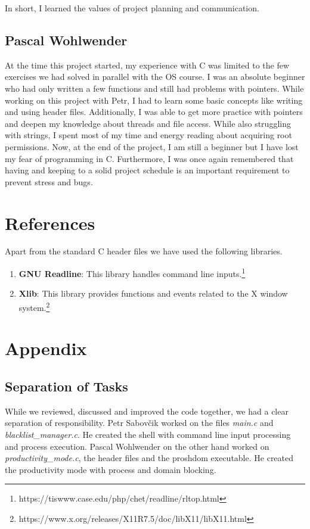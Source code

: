 \documentclass{article}
\begin{document}
In short, I learned the values of project planning and communication.


\subsection{Pascal Wohlwender}

At the time this project started, my experience with C was limited to the few exercises we had solved in parallel with the OS course. I was an absolute beginner who had only written a few functions and still had problems with pointers. While working on this project with Petr, I had to learn some basic concepts like writing and using header files. Additionally, I was able to get more practice with pointers and deepen my knowledge about threads and file access. While also struggling with strings, I spent most of my time and energy reading about acquiring root permissions. Now, at the end of the project, I am still a beginner but I have lost my fear of programming in C. Furthermore, I was once again remembered that having and keeping to a solid project schedule is an important requirement to prevent stress and bugs.

\section{References}

Apart from the standard C header files we have used the following libraries.

\begin{enumerate}
	\item \textbf{GNU Readline}: This library handles command line inputs.\footnote{https://tiswww.case.edu/php/chet/readline/rltop.html}
	\item \textbf{Xlib}: This library provides functions and events related to the X window system.\footnote{https://www.x.org/releases/X11R7.5/doc/libX11/libX11.html}
\end{enumerate}

\pagebreak

\section{Appendix}

\subsection{Separation of Tasks}

While we reviewed, discussed and improved the code together, we had a clear separation of responsibility. Petr Sabovčik worked on the files \textit{main.c} and \textit{blacklist\_manager.c}. He created the shell with command line input processing and process execution. Pascal Wohlwender on the other hand worked on \textit{productivity\_mode.c}, the header files and the proshdom executable. He created the productivity mode with process and domain blocking.
\end{document}
